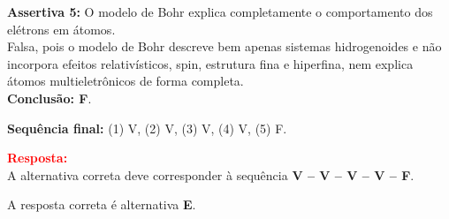 \begin{flushleft}
\bigskip

\textbf{Assertiva 5:} O modelo de Bohr explica completamente o comportamento dos el\'etrons em \'atomos.\\
Falsa, pois o modelo de Bohr descreve bem apenas sistemas hidrogenoides e n\~ao incorpora efeitos relativ\'isticos, spin, estrutura fina e hiperfina, nem explica \'atomos multieletr\^onicos de forma completa.\\
\textbf{Conclus\~ao: F}.

\bigskip

\textbf{Sequ\^encia final:} (1) V, (2) V, (3) V, (4) V, (5) F.

\vspace{0.5cm}

\textcolor{red}{\textbf{Resposta:}}\\
A alternativa correta deve corresponder \`a sequ\^encia \colorbox{green!50}{\textbf{V -- V -- V -- V -- F}}.

A resposta correta \'e alternativa \colorbox{green!50}{\textbf{E}}.

\end{flushleft}

